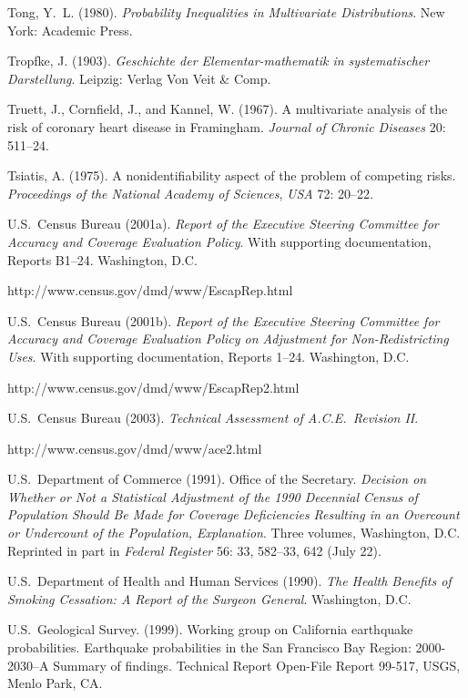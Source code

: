 \smallskip\noindent
Tong, Y.~L. (1980).
{\it Probability Inequalities in Multivariate Distributions\/}.
New York: Academic Press.

\smallskip\noindent
Tropfke, J. (1903).
{\it Geschichte der Elementar-mathematik in systematischer Dar\-stellung\/}.
Leipzig: Verlag Von Veit \& Comp.

\smallskip\noindent
Truett, J., Cornfield, J., and Kannel, W. (1967).
A multivariate analysis of the risk of coronary heart disease in Framingham.
{\it Journal of Chronic Diseases\/} {20}: 511--24.

\smallskip\noindent
Tsiatis, A. (1975).
A nonidentifiability aspect of the problem of competing risks.
{\it Proceedings of the National Academy of Sciences\/}, {\it USA\/} 72: 20--22.

\smallskip\noindent
U.S.~Census Bureau (2001a).
{\it Report of the Executive Steering Committee for Accuracy and Coverage Evaluation Policy\/}.
With supporting documentation, Reports B1--24. Washington, D.C.

\noindent\hskip 10pt
http://www.census.gov/dmd/www/EscapRep.html

\smallskip\noindent
U.S.~Census Bureau (2001b).
{\it Report of the Executive Steering Committee for Accuracy and Coverage Evaluation
Policy on Adjustment for Non-Redistrict\-ing Uses\/}.
With supporting documentation, Reports 1--24. Washington, D.C.

\noindent\hskip 10pt
http://www.census.gov/dmd/www/EscapRep2.html

\smallskip\noindent
U.S.~Census Bureau (2003).
{\it Technical Assessment of A.C.E.~Revision II\/}.

\noindent\hskip 10pt
http://www.census.gov/dmd/www/ace2.html

\smallskip\noindent
U.S.~Department of Commerce (1991).
Office of the Secretary.
{\it Decision on Whether or Not a Statistical Adjustment of the 1990 Decennial Census of Population
Should Be Made for Coverage Deficiencies Resulting in an Overcount or Undercount of the Population, Explanation\/}.
Three volumes, Washington, D.C.
Reprinted in part in {\it Federal Register\/} 56: 33, 582--33, 642 (July 22).

\smallskip\noindent
U.S.~Department of Health and Human Services (1990).
{\it The Health Benefits of Smoking Cessation: A Report of the Surgeon General\/}.
Washington, D.C.

\smallskip\noindent
U.S.~Geological Survey. (1999).
Working group on California earthquake probabilities.
Earthquake probabilities in the San Francisco Bay Region: 2000-2030--A Summary of findings.
Technical Report Open-File Report 99-517, USGS, Menlo Park, CA.

